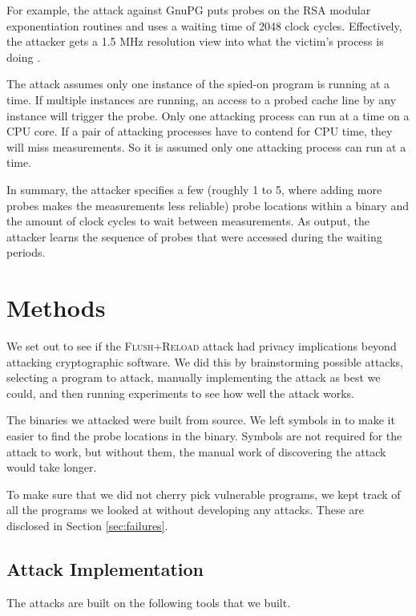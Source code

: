 \documentclass[letterpaper,twocolumn,10pt]{article}
\begin{document}
For example, the attack against GnuPG puts probes on the RSA modular
exponentiation routines and uses a waiting time of 2048 clock cycles.
Effectively, the attacker gets a 1.5 MHz resolution view into what the victim's
process is doing \cite{yarom2013flush}.

The attack assumes only one instance of the spied-on program is running at
a time. If multiple instances are running, an access to a probed cache line by
any instance will trigger the probe. Only one attacking process can run at
a time on a CPU core. If a pair of attacking processes have to contend for CPU
time, they will miss measurements. So it is assumed only one attacking process
can run at a time.

In summary, the attacker specifies a few (roughly 1 to 5, where adding more
probes makes the measurements less reliable) probe locations within a binary and
the amount of clock cycles to wait between measurements. As output, the attacker
learns the sequence of probes that were accessed during the waiting periods.

\section{Methods}
\label{sec:methods}

We set out to see if the \textsc{Flush+Reload} attack had privacy implications
beyond attacking cryptographic software. We did this by brainstorming possible
attacks, selecting a program to attack, manually implementing the attack as best
we could, and then running experiments to see how well the attack works.

The binaries we attacked were built from source. We left symbols in to make it
easier to find the probe locations in the binary. Symbols are not required for
the attack to work, but without them, the manual work of discovering the attack
would take longer.

To make sure that we did not cherry pick vulnerable programs, we kept track of
all the programs we looked at without developing any attacks. These are
disclosed in Section \ref{sec:failures}.

\subsection{Attack Implementation}

The attacks are built on the following tools that we built.
\end{document}
